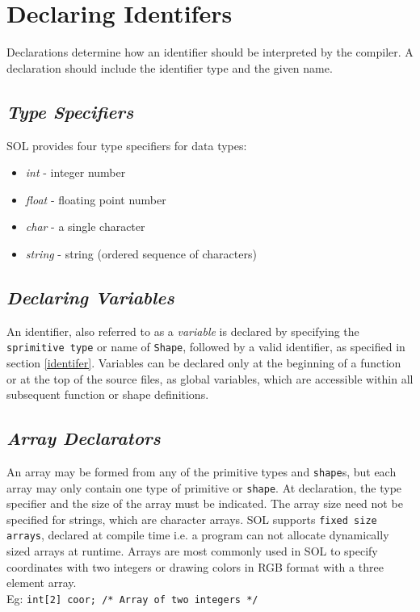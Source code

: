\section{Declaring Identifers}

    Declarations determine how an identifier should be interpreted by the compiler. A declaration should include the identifier type and the given name.

    \subsection{\textit{Type Specifiers}} \label{type}
    SOL provides four type specifiers for data types:
    \begin{itemize}
        \itemsep0em
        \item \textit{int} - integer number
        \item \textit{float} - floating point number
        \item \textit{char} - a single character
        \item \textit{string} - string (ordered sequence of characters)
    \end{itemize}

    \subsection{\textit{Declaring Variables}}
    An identifier, also referred to as a \textit{variable} is declared by specifying the \texttt{sprimitive type} or name of \texttt{Shape}, followed by a valid identifier, as specified in section \ref{identifer}. Variables can be declared only at the beginning of a function or at the top of the source files, as global variables, which are accessible within all subsequent function or shape definitions.

    \subsection{\textit{Array Declarators}} \label{array}
    An array may be formed from any of the primitive types and \texttt{shape}s, but each array may only contain one type of primitive or \texttt{shape}. At declaration, the type specifier and the size of the array must be indicated. The array size need not be specified for strings, which are character arrays. SOL supports \texttt{fixed size arrays}, declared at compile time i.e. a program can not allocate dynamically sized arrays at runtime. Arrays are most commonly used in SOL to specify coordinates with two integers or drawing colors in RGB format with a three element array.\\
    Eg: \texttt{int[2] coor; /* Array of two integers */}


